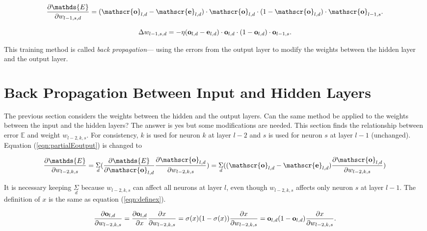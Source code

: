 \begin{equation}
\frac{\partial \mathds{E}}{\partial w_{l-1, s, d}}
= (\mathscr{\bf o}_{l, d} -   \mathscr{\bf e} _{l, d}) \cdot \mathscr{\bf o}_{l, d} \cdot (1 -
\mathscr{\bf o}_{l, d} ) \cdot  \mathscr{\bf o}_{l-1, s}.
\end{equation}

\begin{equation}
\Delta w_{l-1, s,d} = - \eta (\mathscr{\bf o}_{l, d} -   \mathscr{\bf e} _{l, d}) \cdot \mathscr{\bf o}_{l, d} \cdot (1 -
\mathscr{\bf o}_{l, d} ) \cdot  \mathscr{\bf o}_{l-1, s}.
\end{equation}

This training method is called {\it back propagation}--- using the errors from the
output layer to modify the weights between the hidden layer and the
output layer.  

\section{Back Propagation Between Input and Hidden  Layers}

The previous section considers the weights between the hidden and the
output layers.  Can the same method be applied to the weights between
the input and the hidden layers? The answer is yes but some
modifications are needed.   This section finds the
relationship between error $\mathds{E}$ and weight $w_{l-2, k, s}$.
For consistency, $k$ is used for neuron $k$ at layer $l-2$ and $s$ is
used for neuron $s$ at layer $l-1$ (unchanged).  Equation
(\ref{eqn:partialEoutput}) is changed to

\begin{equation}
\frac{\partial \mathds{E}}{\partial w_{l-2,  k, s}}
= \underset{d}{\Sigma} (\frac{\partial \mathds{E}} {\partial \mathscr{\bf o}_{l, d}} \frac{\partial
\mathscr{\bf o}_{l, d}}{\partial w_{l-2,  k, s}})
= \underset{d}{\Sigma} ((\mathscr{\bf o}_{l, d} -   \mathscr{\bf e} _{l, d}) \frac{\partial
\mathscr{\bf o}_{l, d}}{\partial w_{l-2,  k, s}})
\end{equation}

It is necessary keeping $\underset{d}{\Sigma}$ because $w_{l-2, k, s}$
can affect all neurons at layer $l$, even though $w_{l-2, k, s}$
affects only neuron $s$ at layer $l-1$.
The definition of $x$ is the same as equation (\ref{eqn:definex}).

\begin{equation}
\frac{\partial
\mathscr{\bf o}_{l, d}}{\partial w_{l-2,  k, s}} = \frac{\partial \mathscr{\bf o}_{l, d}} {\partial x}
 \frac{\partial x} {\partial w_{l-2, k, s}} = \sigma(x) (1
 - \sigma(x)) \frac{\partial x} {\partial w_{l-2, k, s}}
 = \mathscr{\bf o}_{l, d} (1 - \mathscr{\bf o}_{l, d}) \frac{\partial
 x} {\partial w_{l-2, k, s}}.
\end{equation}

